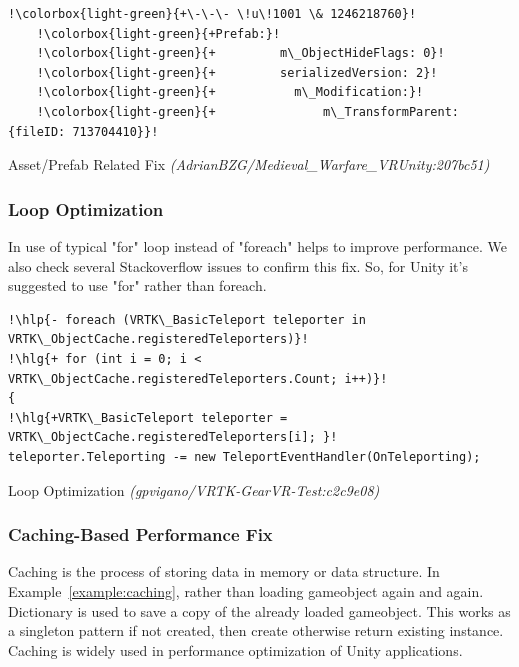 \begin{example}
	\begin{lstlisting}[escapechar=!]	
	!\colorbox{light-green}{+\-\-\- \!u\!1001 \& 1246218760}!  
	!\colorbox{light-green}{+Prefab:}! 
	!\colorbox{light-green}{+         m\_ObjectHideFlags: 0}! 
	!\colorbox{light-green}{+         serializedVersion: 2}! 
	!\colorbox{light-green}{+     		m\_Modification:}! 
	!\colorbox{light-green}{+				m\_TransformParent: {fileID: 713704410}}!      
	\end{lstlisting}
	\caption{Asset/Prefab Related Fix
		\scriptsize{\textit{(AdrianBZG/Medieval\_Warfare\_VR\-Unity:207bc51)}}}
	\label{example:taxonomy1}	
\end{example}
 
\subsubsection{Loop Optimization}
In \unity use of typical "for" loop instead of "foreach" helps to improve performance. We also check several Stackoverflow issues to confirm this fix. So, for Unity it's suggested to use "for" rather than foreach.



\begin{example}
\begin{lstlisting}[escapechar=!]
!\hlp{- foreach (VRTK\_BasicTeleport teleporter in VRTK\_ObjectCache.registeredTeleporters)}!   
!\hlg{+ for (int i = 0; i < VRTK\_ObjectCache.registeredTeleporters.Count; i++)}! 
{
!\hlg{+VRTK\_BasicTeleport teleporter = VRTK\_ObjectCache.registeredTeleporters[i]; }!
teleporter.Teleporting -= new TeleportEventHandler(OnTeleporting);
\end{lstlisting}
  \caption{Loop Optimization
  	\scriptsize{\textit{(gpvigano/VRTK-GearVR-Test:c2c9e08)}}}
  \label{example:diff}  
\end{example}


\subsubsection{Caching-Based Performance Fix}
Caching is the process of storing data in memory or data structure. In Example~\ref{example:caching}, rather than loading gameobject again and again. Dictionary is used to save a copy of the already loaded gameobject. This works as a singleton pattern if not created, then create otherwise return existing instance. Caching is widely used in performance optimization of Unity applications. 

